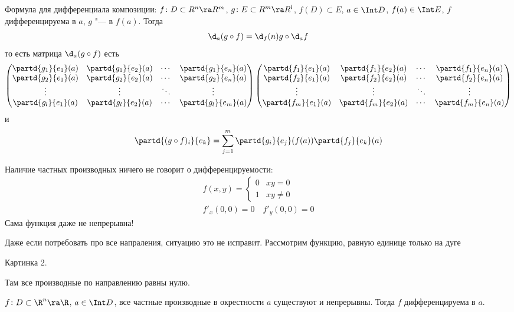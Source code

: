 \begin{conseq}
	Формула для дифференциала композиции:
	$f\colon D \subset R^n \ra R^m$, $g\colon E \subset R^m \ra R^l$, $f(D) \subset E$, $a \in \Int D$, $f(a) \in \Int E$,
	$f$ дифференцируема в $a$, $g$ "--- в $f(a)$.
	Тогда
	\[ \d_a(g \circ f) = \d_f(n) g \circ \d_a f \]
	то есть матрица $\d_a (g \circ f)$ есть
	\[\left(\begin{matrix}
		\partd{g_1}{e_1}(a) & \partd{g_1}{e_2}(a)
			&\cdots& \partd{g_1}{e_n}(a) \\
		\partd{g_2}{e_1}(a) & \partd{g_2}{e_2}(a)
			&\cdots& \partd{g_2}{e_n}(a) \\
		\vdots & \vdots & \ddots & \vdots \\
		\partd{g_l}{e_1}(a) & \partd{g_l}{e_2}(a)
			&\cdots& \partd{g_l}{e_m}(a) \\
	\end{matrix}\right)\left(\begin{matrix}
		\partd{f_1}{e_1}(a) & \partd{f_1}{e_2}(a)
			&\cdots& \partd{f_1}{e_n}(a) \\
		\partd{f_2}{e_1}(a) & \partd{f_2}{e_2}(a)
			&\cdots& \partd{f_2}{e_n}(a) \\
		\vdots & \vdots & \ddots & \vdots \\
		\partd{f_m}{e_1}(a) & \partd{f_m}{e_2}(a)
			&\cdots& \partd{f_m}{e_n}(a) \\
	\end{matrix}\right)\]
	и
	\[ \partd{(g \circ f)_i}{e_k} = \sum_{j = 1}^m \partd{g_i}{e_j} (f(a)) \partd{f_j}{e_k} (a) \]
\end{conseq}

\begin{Rem}
	Наличие частных производных ничего не говорит о дифференцируемости:
	\begin{gather*}
		f(x, y) = \begin{cases} 0 & xy = 0 \\ 1 & xy \ne 0 \end{cases} \\
		f'_x(0, 0) = 0 \quad f'_y(0, 0) = 0
	\end{gather*}
	Сама функция даже не непрерывна!

	Даже если потребовать про все напраления, ситуацию это не исправит. Рассмотрим функцию, равную единице только на дуге

	Картинка 2.

	Там все производные по направлению равны нулю.
\end{Rem}

\begin{theorem}
	$f\colon D \subset \R^n \ra \R$, $a \in \Int D$, все частные производные в окрестности $a$ существуют и непрерывны.
	Тогда $f$ дифференцируема в $a$.
\end{theorem}